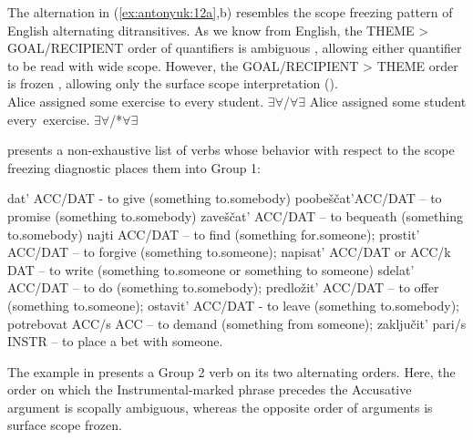 \documentclass[output=paper,colorlinks,citecolor=brown,modfonts,nonflat]{langsci/langscibook}
\begin{document}
The alternation in (\ref{ex:antonyuk:12a},b) resembles the scope freezing pattern of English alternating ditransitives. As we know from English, the THEME  >  GOAL/RECIPIENT order of quantifiers is ambiguous , allowing either quantifier to be read with wide scope. However, the GOAL/RECIPIENT > THEME order is frozen , allowing only the surface scope interpretation (\citealt{Larson1990, Bruening2001}).\\


\ea%
    \label{ex:antonyuk:13}
    \ea \label{ex:antonyuk:13a}
    Alice assigned some exercise to every student. 
    \hfill ${\exists}{\forall}$/${\forall}{\exists}$
    \ex \label{ex:antonyuk:13b}
    Alice assigned some student every~exercise. 
    \hfill ${\exists}{\forall}$/*${\forall}{\exists}$
    \z
\z

 presents a non-exhaustive list of verbs whose behavior with respect to the scope freezing diagnostic places them into Group 1:

\ea%
    \label{ex:antonyuk:14}
    \ea \label{ex:antonyuk:14a}
    dat’ ACC/DAT  {}- to give (something to.somebody)
    \ex \label{ex:antonyuk:14b}
    poobeščat’ACC/DAT – to promise (something to.somebody)
    \ex \label{ex:antonyuk:14c}
    zaveščat’ ACC/DAT – to bequeath (something to.somebody)
    \ex \label{ex:antonyuk:14d}
    najti ACC/DAT – to find (something for.someone);
    \ex \label{ex:antonyuk:14e}
    prostit’ ACC/DAT – to forgive (something to.someone);
    \ex \label{ex:antonyuk:14f}
    napisat’ ACC/DAT or ACC/k DAT – to write (something to.someone or something to someone)
    \ex \label{ex:antonyuk:14g}
    sdelat’ ACC/DAT – to do (something to.somebody);
    \ex \label{ex:antonyuk:14h}
    predložit’ ACC/DAT – to offer (something to.someone);
    \ex \label{ex:antonyuk:14i}
    ostavit’ ACC/DAT  {}- to leave (something to.somebody);
    \ex \label{ex:antonyuk:14j}
    potrebovat ACC/s ACC – to demand (something from someone);
    \ex \label{ex:antonyuk:14k}
    zaključit’ pari/s INSTR – to place a bet with someone.
    \z
\z

The example in  presents a Group 2 verb on its two alternating orders. Here, the order on which the Instrumental-marked phrase precedes the Accusative argument is scopally ambiguous, whereas the opposite order of arguments is surface scope frozen.
\end{document}
